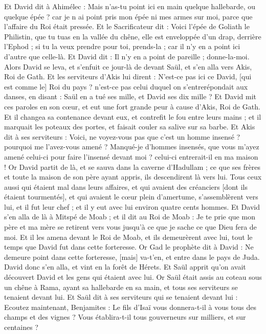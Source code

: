 \begin{multicols}{2}
Et David dit à Ahimélec : Mais n'as-tu point ici en main quelque hallebarde, ou quelque épée ? car je n ai point pris mon épée ni mes armes sur moi, parce que l'affaire du Roi était pressée.
Et le Sacrificateur dit : Voici l'épée de Goliath le Philistin, que tu tuas en la vallée du chêne, elle est enveloppée d'un drap, derrière l'Ephod ; si tu la veux prendre pour toi, prends-la ; car il n'y en a point ici d'autre que celle-là. Et David dit : Il n'y en a point de pareille ; donne-la-moi.
Alors David se leva, et s'enfuit ce jour-là de devant Saül, et s'en alla vers Akis, Roi de Gath.
Et les serviteurs d'Akis lui dirent : N'est-ce pas ici ce David, [qui est comme le] Roi du pays ? n'est-ce pas celui duquel on s'entrerépondait aux danses, en disant : Saül en a tué ses mille, et David ses dix mille ?
Et David mit ces paroles en son cœur, et eut une fort grande peur à cause d'Akis, Roi de Gath.
Et il changea sa contenance devant eux, et contrefit le fou entre leurs mains ; et il marquait les poteaux des portes, et faisait couler sa salive sur sa barbe.
Et Akis dit à ses serviteurs : Voici, ne voyez-vous pas que c'est un homme insensé ? pourquoi me l'avez-vous amené ?
Manqué-je d'hommes insensés, que vous m'ayez amené celui-ci pour faire l'insensé devant moi ? celui-ci entrerait-il en ma maison !
\VerseOne{}Or David partit de là, et se sauva dans la caverne d'Hadullam ; ce que ses frères et toute la maison de son père ayant appris, ils descendirent là vers lui.
Tous ceux aussi qui étaient mal dans leurs affaires, et qui avaient des créanciers [dont ils étaient tourmentés], et qui avaient le cœur plein d'amertume, s'assemblèrent vers lui, et il fut leur chef ; et il y eut avec lui environ quatre cents hommes.
Et David s'en alla de là à Mitspé de Moab ; et il dit au Roi de Moab : Je te prie que mon père et ma mère se retirent vers vous jusqu'à ce que je sache ce que Dieu fera de moi.
Et il les amena devant le Roi de Moab, et ils demeurèrent avec lui, tout le temps que David fut dans cette forteresse.
Or Gad le prophète dit à David : Ne demeure point dans cette forteresse, [mais] va-t'en, et entre dans le pays de Juda. David donc s'en alla, et vint en la forêt de Hérets.
Et Saül apprit qu'on avait découvert David et les gens qui étaient avec lui. Or Saül était assis au coteau sous un chêne à Rama, ayant sa hallebarde en sa main, et tous ses serviteurs se tenaient devant lui.
Et Saül dit à ses serviteurs qui se tenaient devant lui : Ecoutez maintenant, Benjamites : Le fils d'Isaï vous donnera-t-il à vous tous des champs et des vignes ? Vous établira-t-il tous gouverneurs sur milliers, et sur centaines ?

\end{multicols}
